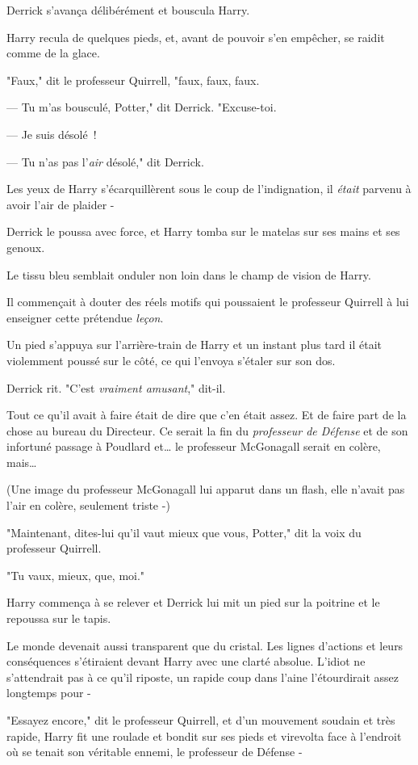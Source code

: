 Derrick s'avança délibérément et bouscula Harry.

Harry recula de quelques pieds, et, avant de pouvoir s'en empêcher, se raidit comme de la glace.

"Faux," dit le professeur Quirrell, "faux, faux, faux.

--- Tu m'as bousculé, Potter," dit Derrick. "Excuse-toi.

--- Je suis désolé~!

--- Tu n'as pas l'\emph{air} désolé," dit Derrick.

Les yeux de Harry s'écarquillèrent sous le coup de l'indignation, il \emph{était} parvenu à avoir l'air de plaider -

Derrick le poussa avec force, et Harry tomba sur le matelas sur ses mains et ses genoux.

Le tissu bleu semblait onduler non loin dans le champ de vision de Harry.

Il commençait à douter des réels motifs qui poussaient le professeur Quirrell à lui enseigner cette prétendue \emph{leçon}.

Un pied s'appuya sur l'arrière-train de Harry et un instant plus tard il était violemment poussé sur le côté, ce qui l'envoya s'étaler sur son dos.

Derrick rit. "C'est \emph{vraiment amusant}," dit-il.

Tout ce qu'il avait à faire était de dire que c'en était assez. Et de faire part de la chose au bureau du Directeur. Ce serait la fin du \emph{professeur de Défense} et de son infortuné passage à Poudlard et… le professeur McGonagall serait en colère, mais…

(Une image du professeur McGonagall lui apparut dans un flash, elle n'avait pas l'air en colère, seulement triste -)

"Maintenant, dites-lui qu'il vaut mieux que vous, Potter," dit la voix du professeur Quirrell.

"Tu vaux, mieux, que, moi."

Harry commença à se relever et Derrick lui mit un pied sur la poitrine et le repoussa sur le tapis.

Le monde devenait aussi transparent que du cristal. Les lignes d'actions et leurs conséquences s'étiraient devant Harry avec une clarté absolue. L'idiot ne s'attendrait pas à ce qu'il riposte, un rapide coup dans l'aine l'étourdirait assez longtemps pour -

"Essayez encore," dit le professeur Quirrell, et d'un mouvement soudain et très rapide, Harry fit une roulade et bondit sur ses pieds et virevolta face à l'endroit où se tenait son véritable ennemi, le professeur de Défense -

